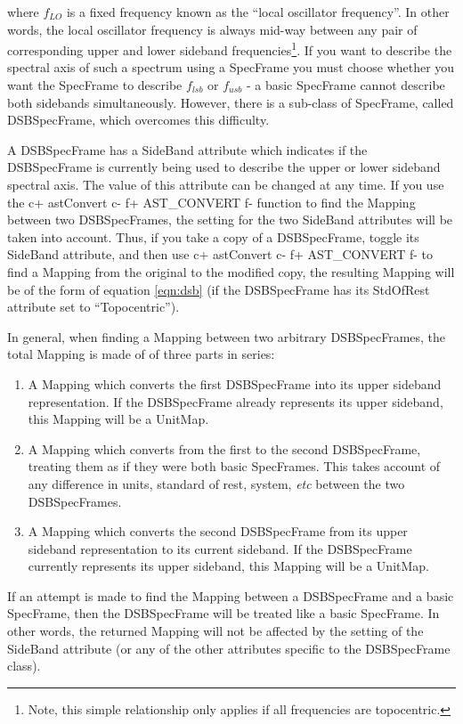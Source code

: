 \documentclass[twoside,11pt]{article}
\begin{document}
where $f_{LO}$ is a fixed frequency known as the ``local oscillator
frequency''. In other words, the local oscillator frequency is always
mid-way between any pair of corresponding upper and lower sideband
frequencies\footnote{Note, this simple relationship only applies if all
frequencies are topocentric.}. If you want to describe the spectral axis
of such a spectrum using a SpecFrame you must choose whether you want the
SpecFrame to describe $f_{lsb}$ or $f_{usb}$ - a basic SpecFrame cannot
describe both sidebands simultaneously. However, there is a sub-class of
SpecFrame, called DSBSpecFrame, which overcomes this difficulty.

A DSBSpecFrame has a SideBand attribute which indicates if the
DSBSpecFrame is currently being used to describe the upper or lower
sideband spectral axis. The value of this attribute can be changed at any
time. If you use the 
c+
astConvert
c-
f+
AST\_CONVERT
f-
function to find the Mapping between two DSBSpecFrames, the setting for
the two SideBand attributes will be taken into account. Thus, if you take
a copy of a DSBSpecFrame, toggle its SideBand attribute, and then use
c+
astConvert
c-
f+
AST\_CONVERT
f-
to find a Mapping from the original to the modified copy, the resulting 
Mapping will be of the form of equation \ref{eqn:dsb} (if the
DSBSpecFrame has its StdOfRest attribute set to ``Topocentric'').

In general, when finding a Mapping between two arbitrary DSBSpecFrames, 
the total Mapping is made of of three parts in series:

\begin{enumerate}
\item A Mapping which converts the first DSBSpecFrame into its upper
sideband representation. If the DSBSpecFrame already represents its upper
sideband, this Mapping will be a UnitMap.
\item A Mapping which converts from the first to the second DSBSpecFrame,
treating them as if they were both basic SpecFrames. This takes account of 
any difference in units, standard of rest, system, \emph{etc} between the
two DSBSpecFrames. 
\item A Mapping which converts the second DSBSpecFrame from its upper
sideband representation to its current sideband. If the DSBSpecFrame 
currently represents its upper sideband, this Mapping will be a UnitMap.
\end{enumerate}

If an attempt is made to find the Mapping between a DSBSpecFrame and a
basic SpecFrame, then the DSBSpecFrame will be treated like a basic
SpecFrame. In other words, the returned Mapping will not be affected by
the setting of the SideBand attribute (or any of the other attributes
specific to the DSBSpecFrame class).
\end{document}
